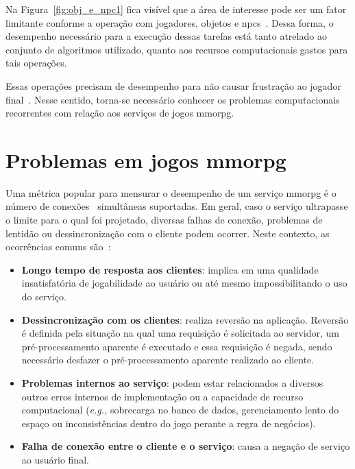 Na Figura~\ref{fig:obj_e_npc1} fica visível que a área de interesse pode ser um fator limitante conforme a operação com jogadores, objetos e \acp{npc}~\cite{albion_online_unite}.
%
Dessa forma, o desempenho necessário para a execução dessas tarefas está tanto atrelado ao conjunto de algoritmos utilizado, quanto aos recursos computacionais gastos para tais operações.


Essas operações precisam de desempenho para não causar frustração ao jogador final~\cite{7008965}.
%
Nesse sentido, torna-se necessário conhecer os problemas computacionais recorrentes com relação aos serviços de jogos \ac{mmorpg}.



\section{Problemas em jogos \ac{mmorpg}}
\label{sec:problemas}

Uma métrica popular para mensurar o desempenho de um serviço \ac{mmorpg} é o número de conexões~\cite{1417630} simultâneas suportadas.
%
Em geral, caso o serviço ultrapasse o limite para o qual foi projetado, diversas falhas de conexão, problemas de lentidão ou dessincronização com o cliente podem ocorrer.
%
Neste contexto, as ocorrências comuns são~\cite{1417630}:

\begin{itemize}
  \item \textbf{Longo tempo de resposta aos clientes}: implica em uma qualidade insatisfatória de jogabilidade ao usuário ou até mesmo impossibilitando o uso do serviço.
  \item \textbf{Dessincronização com os clientes}: realiza reversão na aplicação. Reversão é definida pela situação na qual uma requisição é solicitada ao servidor, um pré-processamento aparente é executado e essa requisição é negada, sendo necessário desfazer o pré-processamento aparente realizado ao cliente.
  \item \textbf{Problemas internos ao serviço}:  podem estar relacionados a diversos outros erros internos de implementação ou a capacidade de recurso computacional (\textit{e.g.,} sobrecarga no banco de dados, gerenciamento lento do espaço ou inconsistências dentro do jogo perante a regra de negócios).
  \item \textbf{Falha de conexão entre o cliente e o serviço}: causa a negação de serviço ao usuário final.
\end{itemize}

